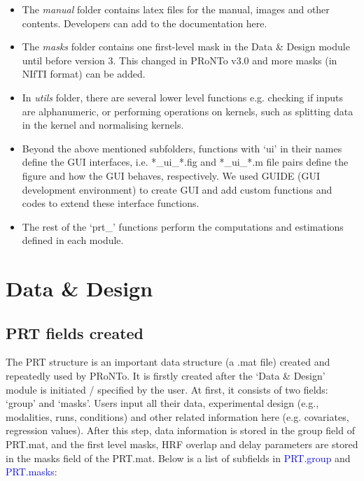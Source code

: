 \begin{itemize}
\item The \textit{manual} folder contains latex files for the manual, images and other contents. Developers can add to the documentation here.

\item The \textit{masks} folder contains one first-level mask in the Data \& Design module until before version 3. This changed in PRoNTo v3.0 and more masks (in NIfTI format) can be added.

\item In \textit{utils} folder, there are several lower level functions e.g. checking if inputs are alphanumeric, or performing operations on kernels, such as splitting data in the kernel and normalising kernels. 
 
\item Beyond the above mentioned subfolders, functions with `ui' in their names define the GUI interfaces, i.e. *\_ui\_*.fig and *\_ui\_*.m file pairs define the figure and how the GUI behaves, respectively. We used GUIDE (GUI development environment) to create GUI and add custom functions and codes to extend these interface functions. 
 
\item The rest of the `prt\_' functions perform the computations and estimations defined in each module.

\end{itemize}





\section{Data \& Design}

\subsection{PRT fields created}

The PRT structure is an important data structure (a .mat file) created and repeatedly used by PRoNTo. It is firstly created after the `Data \& Design' module is initiated / specified by the user. At first, it consists of two fields: `group' and `masks'.  Users input all their data, experimental design (e.g., modalities, runs, conditions) and other related information here (e.g. covariates, regression values). After this step, data information is stored in the group field of PRT.mat, and the first level masks,  HRF overlap and delay parameters are stored in the masks field of the PRT.mat. Below is a list of subfields in \textcolor{blue}{PRT.group} and \textcolor{blue}{PRT.masks}:

